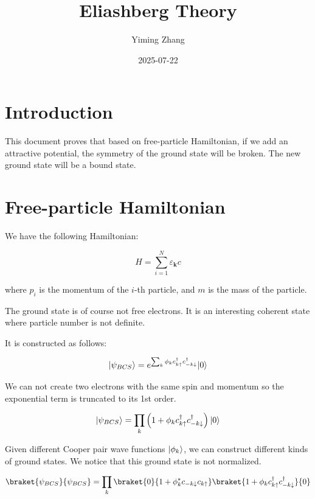 \documentclass[14pt, a4paper]{extarticle}
\DeclarePairedDelimiter\ket{\lvert}{\rangle}
\begin{document}
\title{Eliashberg Theory}
\author{Yiming Zhang}
\date{2025-07-22}

\maketitle

\section{Introduction}
This document proves that based on free-particle Hamiltonian, if we add an attractive potential, the symmetry of
the ground state will be broken. The new ground state will be a bound state.

\section{Free-particle Hamiltonian}

We have the following Hamiltonian:

\begin{equation}
    H = \sum_{i=1}^N \varepsilon_\mathbf{k} c
\end{equation}

where $p_i$ is the momentum of the $i$-th particle, and $m$ is the mass of the particle.

The ground state is of course not free electrons. It is an interesting coherent state where particle number is not definite.

It is constructed as follows:

\begin{equation}
    \ket{\psi_{BCS}} = e^{\sum_{k} \phi_{k} c_{k\uparrow}^\dagger c_{-k\downarrow}^\dagger} \ket{0}
\end{equation}

We can not create two electrons with the same spin and momentum so the exponential term is truncated to its 1st order.

\begin{equation}
    \ket{\psi_{BCS}} = \prod_{k} \left(1 + \phi_{k} c_{k\uparrow}^\dagger c_{-k\downarrow}^\dagger\right) \ket{0}
\end{equation}

Given different Cooper pair wave functions $\ket{\phi_k}$, we can construct different kinds of ground states. We notice that this ground state is not normalized.

\begin{equation}
    \braket{\psi_{BCS}}{\psi_{BCS}} = \prod_{k} \braket{0}{1 + \phi^*_{k} c_{-k\downarrow} c_{k\uparrow}} \braket{1 + \phi_{k} c_{k\uparrow}^\dagger c_{-k\downarrow}^\dagger}{0}
\end{equation}
\end{document}
